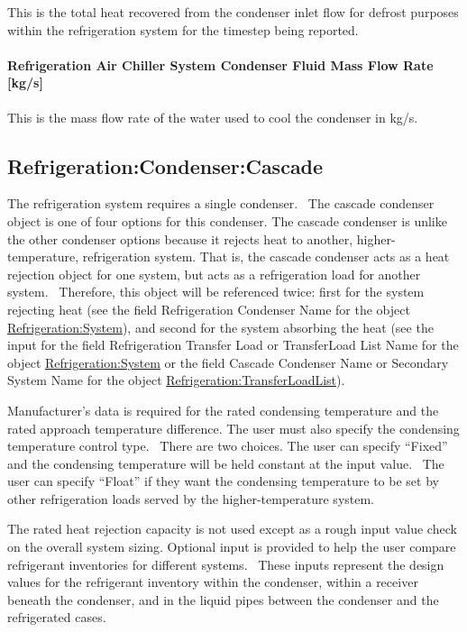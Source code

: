 This is the total heat recovered from the condenser inlet flow for defrost purposes within the refrigeration system for the timestep being reported.

\paragraph{Refrigeration Air Chiller System Condenser Fluid Mass Flow Rate {[}kg/s{]}}\label{refrigeration-air-chiller-system-condenser-fluid-mass-flow-rate-kgs}

This is the mass flow rate of the water used to cool the condenser in kg/s.

\subsection{Refrigeration:Condenser:Cascade}\label{refrigerationcondensercascade}

The refrigeration system requires a single condenser.~ The cascade condenser object is one of four options for this condenser. The cascade condenser is unlike the other condenser options because it rejects heat to another, higher-temperature, refrigeration system. That is, the cascade condenser acts as a heat rejection object for one system, but acts as a refrigeration load for another system.~ Therefore, this object will be referenced twice: first for the system rejecting heat (see the field Refrigeration Condenser Name for the object \hyperref[refrigerationsystem]{Refrigeration:System}), and second for the system absorbing the heat (see the input for the field Refrigeration Transfer Load or TransferLoad List Name for the object \hyperref[refrigerationsystem]{Refrigeration:System} or the field Cascade Condenser Name or Secondary System Name for the object \hyperref[refrigerationtransferloadlist]{Refrigeration:TransferLoadList}).

Manufacturer's data is required for the rated condensing temperature and the rated approach temperature difference. The user must also specify the condensing temperature control type.~ There are two choices. The user can specify ``Fixed'' and the condensing temperature will be held constant at the input value.~ The user can specify ``Float'' if they want the condensing temperature to be set by other refrigeration loads served by the higher-temperature system.

The rated heat rejection capacity is not used except as a rough input value check on the overall system sizing. Optional input is provided to help the user compare refrigerant inventories for different systems.~ These inputs represent the design values for the refrigerant inventory within the condenser, within a receiver beneath the condenser, and in the liquid pipes between the condenser and the refrigerated cases.

